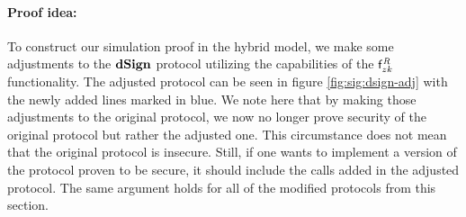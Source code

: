 \paragraph{Proof idea:} To construct our simulation proof in the hybrid model, we make some adjustments to the $\mathbf{dSign}$ protocol utilizing the capabilities of the $\mathsf{f}^{\mathit{R}}_{zk}$ functionality.
The adjusted protocol can be seen in figure \cref{fig:sig:dsign-adj} with the newly added lines marked in blue.
We note here that by making those adjustments to the original protocol, we now no longer prove security of the original protocol but rather the adjusted one.
This circumstance does not mean that the original protocol is insecure.
Still, if one wants to implement a version of the protocol proven to be secure, it should include the calls added in the adjusted protocol.
The same argument holds for all of the modified protocols from this section.
